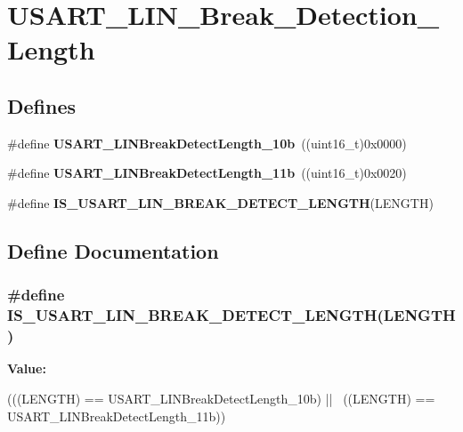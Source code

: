 \hypertarget{group__USART__LIN__Break__Detection__Length}{
\section{USART\_\-LIN\_\-Break\_\-Detection\_\-Length}
\label{group__USART__LIN__Break__Detection__Length}
}
\subsection*{Defines}
\begin{DoxyCompactItemize}
\item 
\hypertarget{group__USART__LIN__Break__Detection__Length_gacfd0aabae8774239440e828c961ac2a0}{
\#define {\bfseries USART\_\-LINBreakDetectLength\_\-10b}~((uint16\_\-t)0x0000)}
\label{group__USART__LIN__Break__Detection__Length_gacfd0aabae8774239440e828c961ac2a0}

\item 
\hypertarget{group__USART__LIN__Break__Detection__Length_gaf591cfcc859d67d71e6fa594eb5aec16}{
\#define {\bfseries USART\_\-LINBreakDetectLength\_\-11b}~((uint16\_\-t)0x0020)}
\label{group__USART__LIN__Break__Detection__Length_gaf591cfcc859d67d71e6fa594eb5aec16}

\item 
\#define {\bfseries IS\_\-USART\_\-LIN\_\-BREAK\_\-DETECT\_\-LENGTH}(LENGTH)
\end{DoxyCompactItemize}


\subsection{Define Documentation}
\hypertarget{group__USART__LIN__Break__Detection__Length_gaa7a45d542b1df5da1160777ad4a80d72}{
\subsubsection[{IS\_\-USART\_\-LIN\_\-BREAK\_\-DETECT\_\-LENGTH}]{\setlength{\rightskip}{0pt plus 5cm}\#define IS\_\-USART\_\-LIN\_\-BREAK\_\-DETECT\_\-LENGTH(LENGTH)}}
\label{group__USART__LIN__Break__Detection__Length_gaa7a45d542b1df5da1160777ad4a80d72}
{\bfseries Value:}
\begin{DoxyCode}
(((LENGTH) == USART_LINBreakDetectLength_10b) || \
                                ((LENGTH) == USART_LINBreakDetectLength_11b))
\end{DoxyCode}
